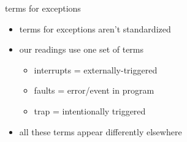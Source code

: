 \begin{frame}{terms for exceptions}
    \begin{itemize}
    \item terms for exceptions aren't standardized
    \vspace{.5cm}
    \item our readings use one set of terms
    \begin{itemize}
        \item interrupts = externally-triggered
        \item faults = error/event in program
        \item trap = intentionally triggered
        \end{itemize}
    \item all these terms appear differently elsewhere
    \end{itemize}
\end{frame}
